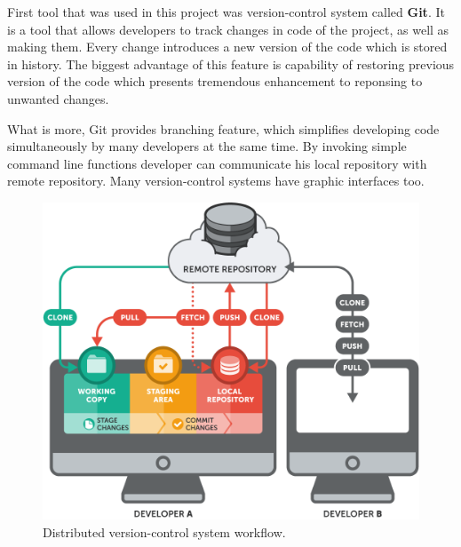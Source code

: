 \documentclass[a4paper,12pt]{book}
\newcommand\tab[1][1cm]{\hspace*{#1}}
\begin{document}
{
\tab First tool that was used in this project was version-control system called \textbf{Git}. It is a tool that allows developers to track changes in code of the project, as well as making them. Every change introduces a new version of the code which is stored in history. The biggest advantage of this feature is capability of restoring previous version of the code which presents tremendous enhancement to reponsing to unwanted changes.

\bigskip
What is more, Git provides branching feature, which simplifies developing code simultaneously by many developers at the same time. By invoking simple command line functions developer can communicate his local repository with remote repository. Many version-control systems have graphic interfaces too.

\bigskip
\begin{figure}[h]
  \centering
    \includegraphics[width=1.0\textwidth]{git}
    \caption{Distributed version-control system workflow.~\cite{git}}
\end{figure}   
}
\end{document}
